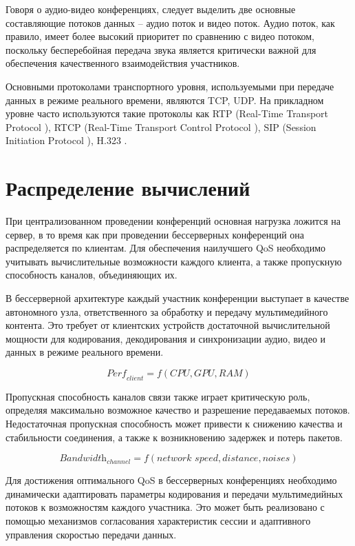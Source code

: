 Говоря о аудио-видео конференциях, следует выделить две основные составляющие потоков данных -- аудио поток и видео поток. Аудио поток, как правило, имеет более высокий приоритет по сравнению с видео потоком, поскольку бесперебойная передача звука является критически важной для обеспечения качественного взаимодействия участников.

Основными протоколами транспортного уровня, используемыми при передаче данных в режиме реального времени, являются TCP, UDP. На прикладном уровне часто используются такие протоколы как RTP (Real-Time Transport Protocol  \cite{rtp}), RTCP (Real-Time Transport Control Protocol  \cite{rtp}), SIP (Session Initiation Protocol \cite{sip}), H.323 \cite{h323}.

\section{Распределение вычислений}

При централизованном проведении конференций основная нагрузка ложится на сервер, в то время как при проведении бессерверных конференций она распределяется по клиентам. Для обеспечения наилучшего QoS необходимо учитывать вычислительные возможности каждого клиента, а также пропускную способность каналов, объединяющих их.

В бессерверной архитектуре каждый участник конференции выступает в качестве автономного узла, ответственного за обработку и передачу мультимедийного контента. Это требует от клиентских устройств достаточной вычислительной мощности для кодирования, декодирования и синхронизации аудио, видео и данных в режиме реального времени.

\begin{equation}
  \textit{Perf}_{client} = f(CPU, GPU, RAM)
\end{equation}

Пропускная способность каналов связи также играет критическую роль, определяя максимально возможное качество и разрешение передаваемых потоков. Недостаточная пропускная способность может привести к снижению качества и стабильности соединения, а также к возникновению задержек и потерь пакетов.

\begin{equation}
  \textit{Bandwidth}_{channel}=f(\textit{network~speed},\textit{distance},\textit{noises})
\end{equation}

Для достижения оптимального QoS в бессерверных конференциях необходимо динамически адаптировать параметры кодирования и передачи мультимедийных потоков к возможностям каждого участника. Это может быть реализовано с помощью механизмов согласования характеристик сессии и адаптивного управления скоростью передачи данных.

